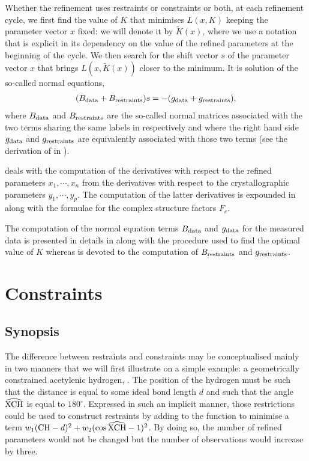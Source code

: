 \documentclass[pdf]{iucr}
\begin{document}
Whether the refinement uses restraints or constraints or both, at each refinement cycle, we first find the value of $K$ that minimises $L(x, K)$ keeping the parameter vector $x$ fixed: we will denote it by $\tilde{K}(x)$, where we use a notation that is explicit in its dependency on the value of the refined parameters at the beginning of the cycle. We then search for the shift vector $s$ of the parameter vector $x$ that brings $L(x, \tilde{K}(x))$ closer to the minimum. It is solution of the so-called normal equations,
\begin{align}
(B_{\text{data}} + B_{\text{restraints}})s = -(g_{\text{data}} + g_{\text{restraints}}),
\label{eqn:generalnormalequations}
\end{align}
where $B_{\text{data}}$ and $B_{\text{restraints}}$ are the so-called normal matrices associated with the two terms sharing the same labels in  respectively and where the right hand side $g_{\text{data}}$ and $g_{\text{restraints}}$ are equivalently associated with those two terms (see the derivation of  in ).

 deals with the computation of the derivatives with respect to the refined parameters $x_1, \cdots, x_n$ from the derivatives with respect to the crystallographic parameters $y_1, \cdots, y_p$. The computation of the latter derivatives is expounded in  along with the formulae for the complex structure factors $F_c$.

The computation of the normal equation terms $B_{\text{data}}$ and $g_{\text{data}}$ for the measured data is presented in details in  along with the procedure used to find the optimal value of $K$ whereas  is devoted to the computation of $B_{\text{restraints}}$ and $g_{\text{restraints}}$.

\section{Constraints}
\label{sec:constraints}

\subsection{Synopsis}

The difference between restraints and constraints may be conceptualised mainly in two manners that we will first illustrate on a simple example: a geometrically constrained acetylenic hydrogen, . The position of the hydrogen must be such that the distance  is equal to some ideal bond length $d$ and such that the angle $\widehat{\ce{XCH}}$ is equal to $180^\circ$. Expressed in such an implicit manner, those restrictions could be used to construct restraints by adding to the function to minimise a term $w_1 (\ce{CH} - d)^2 + w_2 (\cos \widehat{\ce{XCH}} - 1)^2$. By doing so, the number of refined parameters would not be changed but the number of observations would increase by three. 
\end{document}
